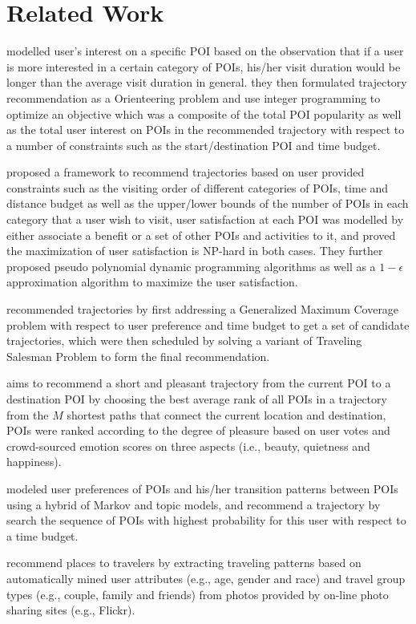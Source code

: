 \section{Related Work}
\label{relatedwork}

\cite{ijcai15} modelled user's interest on a specific POI based on the observation that if a user is more interested in a 
certain category of POIs, his/her visit duration would be longer than the average visit duration in general.
they then formulated trajectory recommendation as a Orienteering problem and use integer programming to optimize an objective
which was a composite of the total POI popularity as well as the total user interest on POIs in the recommended trajectory 
with respect to a number of constraints such as the start/destination POI and time budget.

\cite{wsdm14} proposed a framework to recommend trajectories based on user provided constraints such as the visiting order of different 
categories of POIs, time and distance budget as well as the upper/lower bounds of the number of POIs in each category that a user wish 
to visit, user satisfaction at each POI was modelled by either associate a benefit or a set of other POIs and activities to it, 
and proved the maximization of user satisfaction is NP-hard in both cases. 
They further proposed pseudo polynomial dynamic programming algorithms as well as 
a $1-\epsilon$ approximation algorithm to maximize the user satisfaction.

\cite{tripbuilder15} recommended trajectories by first addressing a Generalized Maximum Coverage problem with respect to user preference and 
time budget to get a set of candidate trajectories, which were then scheduled by solving a variant of Traveling Salesman Problem to form the 
final recommendation.

\cite{ht14} aims to recommend a short and pleasant trajectory from the current POI to a destination POI by choosing the best average rank 
of all POIs in a trajectory from the $M$ shortest paths that connect the current location and destination,
POIs were ranked according to the degree of pleasure based on user votes and  crowd-sourced emotion scores on three aspects 
(i.e., beauty, quietness and happiness).

\cite{geophoto13} modeled user preferences of POIs and his/her transition patterns between POIs using a hybrid of 
Markov and topic models, and recommend a trajectory by search the sequence of POIs with highest probability for this user 
with respect to a time budget.

\cite{travel13} recommend places to travelers by extracting traveling patterns based on automatically mined user attributes 
(e.g., age, gender and race) and travel group types (e.g., couple, family and friends) from photos provided by on-line photo 
sharing sites (e.g., Flickr).
